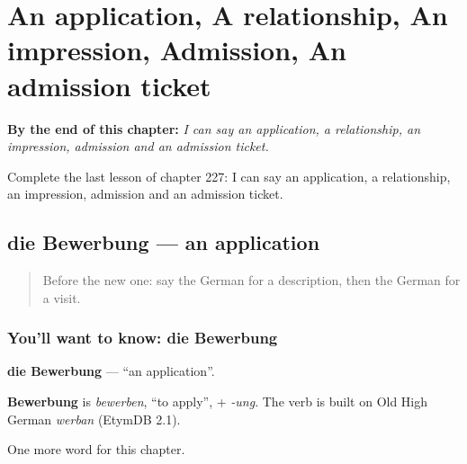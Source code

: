 
\chapter{An application, A relationship, An impression, Admission, An admission ticket}
\label{ch:ge-an-application-a-relationship-an-impression-admission-an-admission-ticket}

\begin{chapteropening}
\textbf{By the end of this chapter:} \emph{I can say an application, a relationship, an impression, admission and an admission ticket.}

Complete the last lesson of chapter 227: I can say an application, a relationship, an impression, admission and an admission ticket.
\end{chapteropening}

\section[die Bewerbung]{die Bewerbung — an application}

\label{lesson:GE-C227-bewerbung}



\begin{quote}
Before the new one: say the German for a description, then the German for a visit.
\end{quote}

\subsection*{You'll want to know: die Bewerbung}
\textbf{die Bewerbung} — \textquotedblleft{}an application\textquotedblright{}.

\begin{cousinweb}
\textbf{Bewerbung} is \emph{bewerben}, \textquotedblleft{}to apply\textquotedblright{}, + \emph{-ung}. The verb is built on Old High German \emph{werban} (EtymDB 2.1).
\end{cousinweb}

\begin{grammarlens}[title={What you've built}]
One more word for this chapter.
\end{grammarlens}

